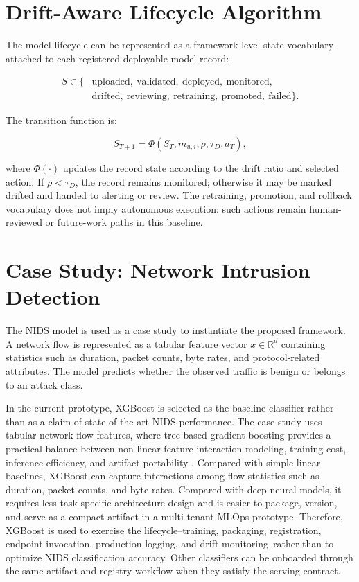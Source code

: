 \documentclass[runningheads]{llncs}
\begin{document}
\section{Drift-Aware Lifecycle Algorithm}

The model lifecycle can be represented as a framework-level state vocabulary attached to each registered deployable model record:

\begin{equation}
\begin{split}
S \in \{&
\mathrm{uploaded},\ \mathrm{validated},\ \mathrm{deployed},\
\mathrm{monitored},\\
&\mathrm{drifted},\ \mathrm{reviewing},\ \mathrm{retraining},\
\mathrm{promoted},\ \mathrm{failed}
\}.
\end{split}
\end{equation}

The transition function is:

\begin{equation}
S_{T+1}=\Phi(S_T,m_{u,i},\rho,\tau_D,a_T),
\end{equation}

where $\Phi(\cdot)$ updates the record state according to the drift ratio and selected action. If $\rho < \tau_D$, the record remains monitored; otherwise it may be marked drifted and handed to alerting or review. The retraining, promotion, and rollback vocabulary does not imply autonomous execution: such actions remain human-reviewed or future-work paths in this baseline.

\section{Case Study: Network Intrusion Detection}

The NIDS model is used as a case study to instantiate the proposed framework. A network flow is represented as a tabular feature vector $x \in \mathbb{R}^{d}$ containing statistics such as duration, packet counts, byte rates, and protocol-related attributes. The model predicts whether the observed traffic is benign or belongs to an attack class.

In the current prototype, XGBoost is selected as the baseline classifier rather than as a claim of state-of-the-art NIDS performance. The case study uses tabular network-flow features, where tree-based gradient boosting provides a practical balance between non-linear feature interaction modeling, training cost, inference efficiency, and artifact portability \cite{xgboost}. Compared with simple linear baselines, XGBoost can capture interactions among flow statistics such as duration, packet counts, and byte rates. Compared with deep neural models, it requires less task-specific architecture design and is easier to package, version, and serve as a compact artifact in a multi-tenant MLOps prototype. Therefore, XGBoost is used to exercise the lifecycle--training, packaging, registration, endpoint invocation, production logging, and drift monitoring--rather than to optimize NIDS classification accuracy. Other classifiers can be onboarded through the same artifact and registry workflow when they satisfy the serving contract.
\end{document}
